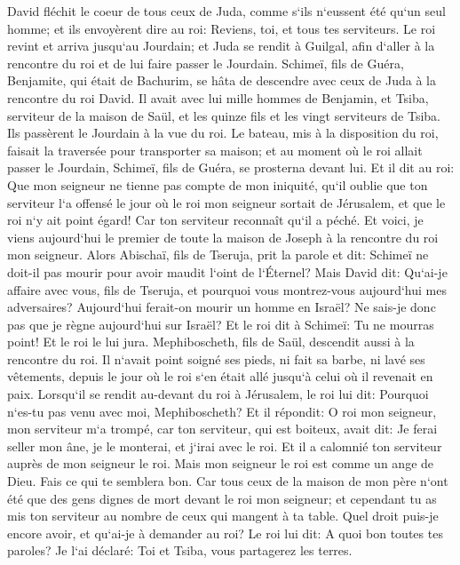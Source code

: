 \verse David fléchit le coeur de tous ceux de Juda, comme s`ils n`eussent été qu`un seul homme; et ils envoyèrent dire au roi: Reviens, toi, et tous tes serviteurs. 
\verse Le roi revint et arriva jusqu`au Jourdain; et Juda se rendit à Guilgal, afin d`aller à la rencontre du roi et de lui faire passer le Jourdain. 
\verse Schimeï, fils de Guéra, Benjamite, qui était de Bachurim, se hâta de descendre avec ceux de Juda à la rencontre du roi David. 
\verse Il avait avec lui mille hommes de Benjamin, et Tsiba, serviteur de la maison de Saül, et les quinze fils et les vingt serviteurs de Tsiba. Ils passèrent le Jourdain à la vue du roi. 
\verse Le bateau, mis à la disposition du roi, faisait la traversée pour transporter sa maison; et au moment où le roi allait passer le Jourdain, Schimeï, fils de Guéra, se prosterna devant lui. 
\verse Et il dit au roi: Que mon seigneur ne tienne pas compte de mon iniquité, qu`il oublie que ton serviteur l`a offensé le jour où le roi mon seigneur sortait de Jérusalem, et que le roi n`y ait point égard! 
\verse Car ton serviteur reconnaît qu`il a péché. Et voici, je viens aujourd`hui le premier de toute la maison de Joseph à la rencontre du roi mon seigneur. 
\verse Alors Abischaï, fils de Tseruja, prit la parole et dit: Schimeï ne doit-il pas mourir pour avoir maudit l`oint de l`Éternel? 
\verse Mais David dit: Qu`ai-je affaire avec vous, fils de Tseruja, et pourquoi vous montrez-vous aujourd`hui mes adversaires? Aujourd`hui ferait-on mourir un homme en Israël? Ne sais-je donc pas que je règne aujourd`hui sur Israël? 
\verse Et le roi dit à Schimeï: Tu ne mourras point! Et le roi le lui jura. 
\verse Mephiboscheth, fils de Saül, descendit aussi à la rencontre du roi. Il n`avait point soigné ses pieds, ni fait sa barbe, ni lavé ses vêtements, depuis le jour où le roi s`en était allé jusqu`à celui où il revenait en paix. 
\verse Lorsqu`il se rendit au-devant du roi à Jérusalem, le roi lui dit: Pourquoi n`es-tu pas venu avec moi, Mephiboscheth? 
\verse Et il répondit: O roi mon seigneur, mon serviteur m`a trompé, car ton serviteur, qui est boiteux, avait dit: Je ferai seller mon âne, je le monterai, et j`irai avec le roi. 
\verse Et il a calomnié ton serviteur auprès de mon seigneur le roi. Mais mon seigneur le roi est comme un ange de Dieu. Fais ce qui te semblera bon. 
\verse Car tous ceux de la maison de mon père n`ont été que des gens dignes de mort devant le roi mon seigneur; et cependant tu as mis ton serviteur au nombre de ceux qui mangent à ta table. Quel droit puis-je encore avoir, et qu`ai-je à demander au roi? 
\verse Le roi lui dit: A quoi bon toutes tes paroles? Je l`ai déclaré: Toi et Tsiba, vous partagerez les terres. 
